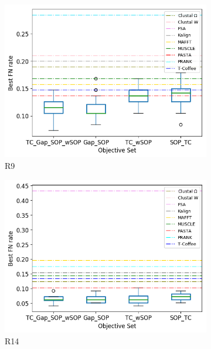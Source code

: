 \begin{figure}[!htbp]
\begin{adjustwidth}{-1cm}{-1cm}
\begin{subfigure}{0.22\textwidth}
			\includegraphics[width=\columnwidth]{Figure/summary/precomputedInit/R9/objset_fnrate_rank}
			\caption{R9}
		\end{subfigure}
		\begin{subfigure}{0.22\textwidth}
			\includegraphics[width=\columnwidth]{Figure/summary/precomputedInit/R14/objset_fnrate_rank}
			\caption{R14}
		\end{subfigure}
		\begin{subfigure}{0.22\textwidth}

\end{subfigure}
\end{adjustwidth}
\end{figure}
